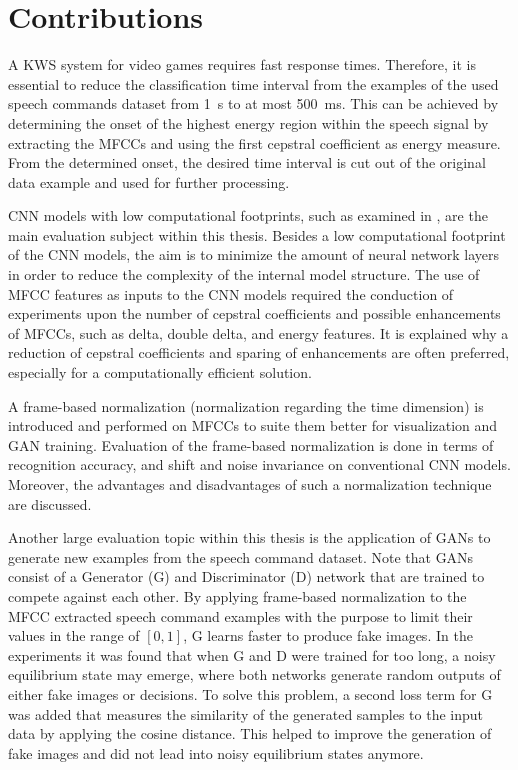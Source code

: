 
\section{Contributions}
A KWS system for video games requires fast response times.
Therefore, it is essential to reduce the classification time interval from the examples of the used speech commands dataset \cite{Warden2018SpeechCommands} from \SI{1}{\second} to at most \SI{500}{\milli\second}.
This can be achieved by determining the onset of the highest energy region within the speech signal by extracting the MFCCs and using the first cepstral coefficient as energy measure.
From the determined onset, the desired time interval is cut out of the original data example and used for further processing.

CNN models with low computational footprints, such as examined in \cite{Sainath2015KWS}, are the main evaluation subject within this thesis.
Besides a low computational footprint of the CNN models, the aim is to minimize the amount of neural network layers in order to reduce the complexity of the internal model structure.
The use of MFCC features as inputs to the CNN models required the conduction of experiments upon the number of cepstral coefficients and possible enhancements of MFCCs, such as delta, double delta, and energy features.
It is explained why a reduction of cepstral coefficients and sparing of enhancements are often preferred, especially for a computationally efficient solution.

A frame-based normalization (normalization regarding the time dimension) is introduced and performed on MFCCs to suite them better for visualization and GAN training.
Evaluation of the frame-based normalization is done in terms of recognition accuracy, and shift and noise invariance on conventional CNN models.
Moreover, the advantages and disadvantages of such a normalization technique are discussed.

Another large evaluation topic within this thesis is the application of GANs to generate new examples from the speech command dataset.
Note that GANs consist of a Generator (G) and Discriminator (D) network that are trained to compete against each other.
By applying frame-based normalization to the MFCC extracted speech command examples with the purpose to limit their values in the range of $[0, 1]$, G learns faster to produce fake images.
In the experiments it was found that when G and D were trained for too long, a noisy equilibrium state may emerge, where both networks generate random outputs of either fake images or decisions.
To solve this problem, a second loss term for G was added that measures the similarity of the generated samples to the input data by applying the cosine distance.
This helped to improve the generation of fake images and did not lead into noisy equilibrium states anymore.

